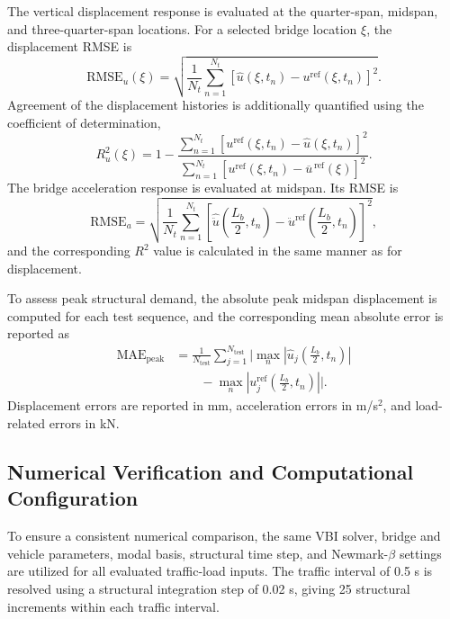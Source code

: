 \documentclass[journal]{IEEEtran}
\begin{document}
The vertical displacement response is evaluated at the quarter-span, midspan, and three-quarter-span locations. For a selected bridge location $\xi$, the displacement RMSE is
\begin{equation}
\mathrm{RMSE}_{u}(\xi)=\sqrt{\frac{1}{N_t}\sum_{n=1}^{N_t}\left[\widehat{u}(\xi,t_n)-u^{\mathrm{ref}}(\xi,t_n)\right]^2}.
\end{equation}
Agreement of the displacement histories is additionally quantified using the coefficient of determination,
\begin{equation}
R_u^2(\xi)=1-\frac{\displaystyle\sum_{n=1}^{N_t}\left[u^{\mathrm{ref}}(\xi,t_n)-\widehat{u}(\xi,t_n)\right]^2}{\displaystyle\sum_{n=1}^{N_t}\left[u^{\mathrm{ref}}(\xi,t_n)-\overline{u}^{\,\mathrm{ref}}(\xi)\right]^2}.
\end{equation}
The bridge acceleration response is evaluated at midspan. Its RMSE is
\begin{equation}
\mathrm{RMSE}_{a}=\sqrt{\frac{1}{N_t}\sum_{n=1}^{N_t}\left[\widehat{\ddot{u}}\left(\frac{L_b}{2},t_n\right)-\ddot{u}^{\mathrm{ref}}\left(\frac{L_b}{2},t_n\right)\right]^2},
\end{equation}
and the corresponding $R^2$ value is calculated in the same manner as for displacement.

To assess peak structural demand, the absolute peak midspan displacement is computed for each test sequence, and the corresponding mean absolute error is reported as
\begin{equation}
\begin{aligned}
\mathrm{MAE}_{\mathrm{peak}} &=\frac{1}{N_{\mathrm{test}}}\sum_{j=1}^{N_{\mathrm{test}}}\Bigg|\max_{n}\left|\widehat{u}_{j}\left(\frac{L_b}{2},t_n\right)\right|\\
&\qquad-\max_{n}\left|u_{j}^{\mathrm{ref}}\left(\frac{L_b}{2},t_n\right)\right|\Bigg|.
\end{aligned}
\end{equation}
Displacement errors are reported in mm, acceleration errors in m/s$^2$, and load-related errors in kN.

\subsection{Numerical Verification and Computational Configuration}

To ensure a consistent numerical comparison, the same VBI solver, bridge and vehicle parameters, modal basis, structural time step, and Newmark-$\beta$ settings are utilized for all evaluated traffic-load inputs. The traffic interval of 0.5 s is resolved using a structural integration step of 0.02 s, giving 25 structural increments within each traffic interval.
\end{document}
